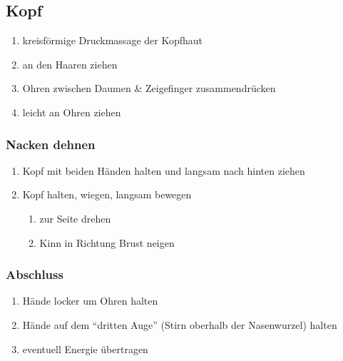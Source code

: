 \subsection{Kopf}
\begin{enumerate}
\item kreisförmige Druckmassage der Kopfhaut
\item an den Haaren ziehen
\item Ohren zwischen Daumen \& Zeigefinger zusammendrücken
\item leicht an Ohren ziehen
\end{enumerate}

\subsubsection{Nacken dehnen}
\begin{enumerate}
\item Kopf mit beiden Händen halten und langsam nach hinten ziehen
\item Kopf halten, wiegen, langsam bewegen
	\begin{enumerate}
	\item zur Seite drehen
	\item Kinn in Richtung Brust neigen
	\end{enumerate}
\end{enumerate}

\subsubsection{Abschluss}
\begin{enumerate}
\item Hände locker um Ohren halten
\item Hände auf dem "`dritten Auge"' (Stirn oberhalb der Nasenwurzel) halten
\item eventuell Energie übertragen
\end{enumerate}
